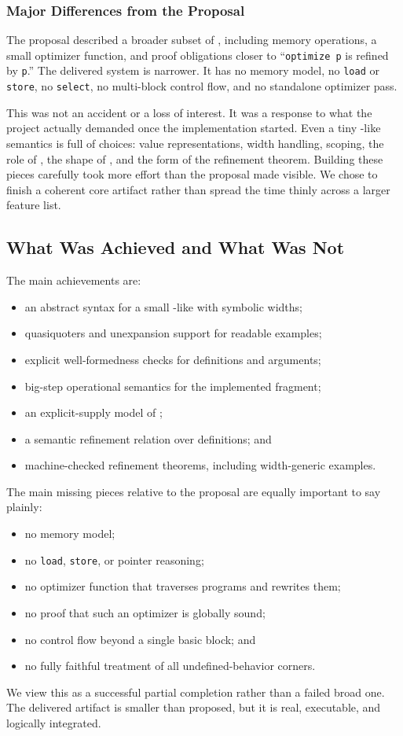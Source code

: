\subsubsection{Major Differences from the Proposal}

The proposal described a broader subset of \llvm, including memory
operations, a small optimizer function, and proof obligations closer to
``\texttt{optimize p} is refined by \texttt{p}.'' The delivered system is narrower.
It has no memory model, no \texttt{load} or \texttt{store}, no
\texttt{select}, no multi-block control flow, and no standalone optimizer
pass.

This was not an accident or a loss of interest. It was a response to what the
project actually demanded once the implementation started. Even a tiny
\llvm-like semantics is full of choices: value representations, width
handling, scoping, the role of \poison, the shape of \vundef, and the form of
the refinement theorem. Building these pieces carefully took more effort than
the proposal made visible. We chose to finish a coherent core artifact rather
than spread the time thinly across a larger feature list.


\subsection{What Was Achieved and What Was Not}

The main achievements are:
\begin{itemize}
  \item an abstract syntax for a small \llvm-like \ir with symbolic widths;
  \item \lean quasiquoters and unexpansion support for readable examples;
  \item explicit well-formedness checks for definitions and arguments;
  \item big-step operational semantics for the implemented fragment;
  \item an explicit-supply model of \vundef;
  \item a semantic refinement relation over definitions; and
  \item machine-checked refinement theorems, including width-generic examples.
\end{itemize}

The main missing pieces relative to the proposal are equally important to say
plainly:
\begin{itemize}
  \item no memory model;
  \item no \texttt{load}, \texttt{store}, or pointer reasoning;
  \item no optimizer function that traverses programs and rewrites them;
  \item no proof that such an optimizer is globally sound;
  \item no control flow beyond a single basic block; and
  \item no fully faithful treatment of all \llvm undefined-behavior corners.
\end{itemize}

We view this as a successful partial completion rather than a failed broad one.
The delivered artifact is smaller than proposed, but it is real, executable,
and logically integrated.
